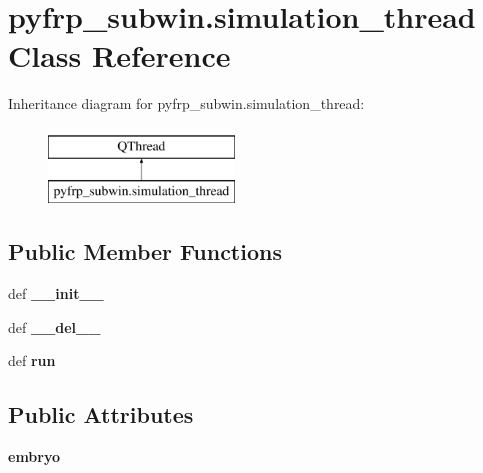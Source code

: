 \hypertarget{classpyfrp__subwin_1_1simulation__thread}{\section{pyfrp\+\_\+subwin.\+simulation\+\_\+thread Class Reference}
\label{classpyfrp__subwin_1_1simulation__thread}
}
Inheritance diagram for pyfrp\+\_\+subwin.\+simulation\+\_\+thread\+:\begin{figure}[H]
\begin{center}
\leavevmode
\includegraphics[height=2.000000cm]{classpyfrp__subwin_1_1simulation__thread}
\end{center}
\end{figure}
\subsection*{Public Member Functions}
\begin{DoxyCompactItemize}
\item 
\hypertarget{classpyfrp__subwin_1_1simulation__thread_a35791374002f347d264c403f58438a48}{def {\bfseries \+\_\+\+\_\+init\+\_\+\+\_\+}}\label{classpyfrp__subwin_1_1simulation__thread_a35791374002f347d264c403f58438a48}

\item 
\hypertarget{classpyfrp__subwin_1_1simulation__thread_a5efcac439e906c4e25a906e55978fcd3}{def {\bfseries \+\_\+\+\_\+del\+\_\+\+\_\+}}\label{classpyfrp__subwin_1_1simulation__thread_a5efcac439e906c4e25a906e55978fcd3}

\item 
\hypertarget{classpyfrp__subwin_1_1simulation__thread_a99ae824712e6805340e07f07b9594ec3}{def {\bfseries run}}\label{classpyfrp__subwin_1_1simulation__thread_a99ae824712e6805340e07f07b9594ec3}

\end{DoxyCompactItemize}
\subsection*{Public Attributes}
\begin{DoxyCompactItemize}
\item 
\hypertarget{classpyfrp__subwin_1_1simulation__thread_a44926d141eb3e5b215cd80130b97401e}{{\bfseries embryo}}\label{classpyfrp__subwin_1_1simulation__thread_a44926d141eb3e5b215cd80130b97401e}

\end{DoxyCompactItemize}
